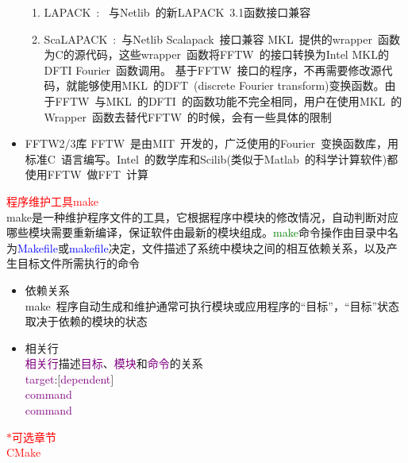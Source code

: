 \documentclass{article}      %
\begin{document}
\begin{itemize}
\begin{enumerate}
			\item \textrm{LAPACK~}:~ 与\textrm{Netlib~}的新\textrm{LAPACK~3.1}函数接口兼容
			\item \textrm{ScaLAPACK~}:~与\textrm{Netlib Scalapack~}接口兼容
				\textrm{MKL~}提供的\textrm{wrapper~}函数为C的源代码，这些\textrm{wrapper~}函数将\textrm{FFTW~}的接口转换为\textrm{Intel MKL}的\textrm{DFTI Fourier~}函数调用。 基于\textrm{FFTW~}接口的程序，不再需要修改源代码，就能够使用\textrm{MKL~}的\textrm{DFT~(discrete Fourier transform)}变换函数。由于\textrm{FFTW~}与\textrm{MKL~}的\textrm{DFTI~}的函数功能不完全相同，用户在使用\textrm{MKL~}的\textrm{Wrapper~}函数去替代\textrm{FFTW~}的时候，会有一些具体的限制
		\end{enumerate}
	\item FFTW2/3库
		\textrm{FFTW~}是由\textrm{MIT~}开发的，广泛使用的\textrm{Fourier~}变换函数库，用标准\textrm{C~}语言编写。\textrm{Intel~}的数学库和\textrm{Scilib}(类似于\textrm{Matlab~}的科学计算软件)都使用\textrm{FFTW~}做\textrm{FFT~}计算
\end{itemize}

\textcolor{red}{程序维护工具make}\\
\textrm{make}是一种维护程序文件的工具，它根据程序中模块的修改情况，自动判断对应哪些模块需要重新编译，保证软件由最新的模块组成。\textcolor{green}{\textrm{make}}命令操作由目录中名为\textcolor{blue}{\textrm{Makefile}}或\textcolor{blue}{\textrm{makefile}}决定，文件描述了系统中模块之间的相互依赖关系，以及产生目标文件所需执行的命令
\begin{itemize}
	\item 依赖关系\\
		\textrm{make~}程序自动生成和维护通常可执行模块或应用程序的“目标”，“目标”状态取决于依赖的模块的状态
	\item 相关行\\
		\textcolor{purple}{相关行}描述\textcolor{purple}{目标}、\textcolor{purple}{模块}和\textcolor{purple}{命令}的关系\\
		\textcolor{purple}{\textrm{target}}:$[$\textcolor{purple}{\textrm{dependent}}$]$\\
		\indent\;\;\;\;\;\;\textcolor{purple}{\textrm{command}}\\
		\indent\;\;\;\;\;\;\textcolor{purple}{\textrm{command}}
\end{itemize}
\textcolor{red}{$\ast$可选章节\\CMake}
\end{document}
